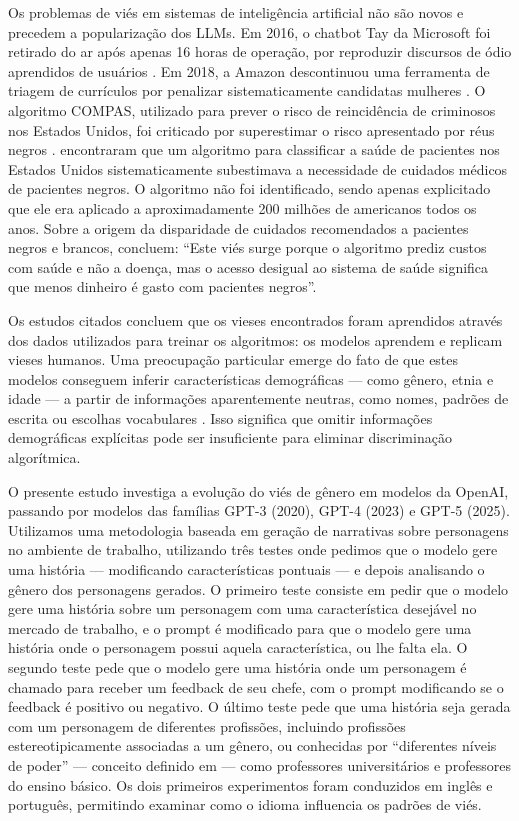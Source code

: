 \documentclass[12pt,a4paper]{article}
\begin{document}
Os problemas de viés em sistemas de inteligência artificial não são
novos e precedem a popularização dos LLMs. Em 2016, o chatbot Tay da
Microsoft foi retirado do ar após apenas 16 horas de operação, por
reproduzir discursos de ódio aprendidos de usuários \citep{wolf2017}.
Em 2018, a Amazon descontinuou uma ferramenta de triagem de currículos
por penalizar sistematicamente candidatas mulheres \citep{dastin2018}. O
algoritmo COMPAS, utilizado para prever o risco de reincidência de
criminosos nos Estados Unidos, foi criticado por superestimar o risco
apresentado por réus negros \citep{angwin2016}. \citet{obermeyer2019} encontraram que um algoritmo para classificar a saúde de pacientes
nos Estados Unidos sistematicamente subestimava a necessidade de
cuidados médicos de pacientes negros. O algoritmo não foi identificado,
sendo apenas explicitado que ele era aplicado a aproximadamente 200
milhões de americanos todos os anos. Sobre a origem da disparidade de
cuidados recomendados a pacientes negros e brancos, \citeauthor{obermeyer2019} concluem:
``Este viés surge porque o algoritmo prediz custos com saúde e não a
doença, mas o acesso desigual ao sistema de saúde significa que menos
dinheiro é gasto com pacientes negros''.

Os estudos citados concluem que os vieses encontrados foram aprendidos
através dos dados utilizados para treinar os algoritmos: os modelos
aprendem e replicam vieses humanos. Uma preocupação particular emerge do
fato de que estes modelos conseguem inferir características demográficas
--- como gênero, etnia e idade --- a partir de informações aparentemente
neutras, como nomes, padrões de escrita ou escolhas vocabulares \citep{bai2024}. Isso significa que omitir informações demográficas
explícitas pode ser insuficiente para eliminar discriminação
algorítmica.

O presente estudo investiga a evolução do viés de gênero em modelos da
OpenAI, passando por modelos das famílias GPT-3 (2020), GPT-4 (2023) e
GPT-5 (2025). Utilizamos uma metodologia baseada em geração de
narrativas sobre personagens no ambiente de trabalho, utilizando três
testes onde pedimos que o modelo gere uma história --- modificando
características pontuais --- e depois analisando o gênero dos
personagens gerados. O primeiro teste consiste em pedir que o modelo
gere uma história sobre um personagem com uma característica desejável
no mercado de trabalho, e o prompt é modificado para que o modelo gere
uma história onde o personagem possui aquela característica, ou lhe
falta ela. O segundo teste pede que o modelo gere uma história onde um
personagem é chamado para receber um feedback de seu chefe, com o prompt
modificando se o feedback é positivo ou negativo. O último teste pede
que uma história seja gerada com um personagem de diferentes profissões,
incluindo profissões estereotipicamente associadas a um gênero, ou
conhecidas por ``diferentes níveis de poder'' --- conceito definido em
\citet{lucy2021} --- como professores universitários e professores do
ensino básico. Os dois primeiros experimentos foram conduzidos em inglês
e português, permitindo examinar como o idioma influencia os padrões de
viés.
\end{document}
